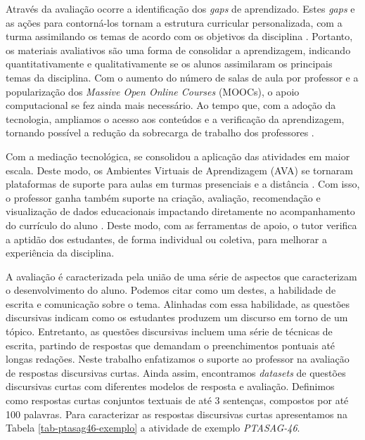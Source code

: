 Através da avaliação ocorre a identificação dos \textit{gaps} de aprendizado. Estes \textit{gaps} e as ações para contorná-los tornam a estrutura curricular personalizada, com a turma assimilando os temas de acordo com os objetivos da disciplina \cite{biggs1998}. Portanto, os materiais avaliativos são uma forma de consolidar a aprendizagem, indicando quantitativamente e qualitativamente se os alunos assimilaram os principais temas da disciplina. Com o aumento do número de salas de aula por professor e a popularização dos \textit{Massive Open Online Courses} (MOOCs), o apoio computacional se fez ainda mais necessário. Ao tempo que, com a adoção da tecnologia, ampliamos o acesso aos conteúdos e a verificação da aprendizagem, tornando possível a redução da sobrecarga de trabalho dos professores \cite{dunlap2005}.

Com a mediação tecnológica, se consolidou a aplicação das atividades em maior escala. Deste modo, os Ambientes Virtuais de Aprendizagem (AVA) \cite{maquine2020} se tornaram plataformas de suporte para aulas em turmas presenciais e a distância \cite{raes2020}. Com isso, o professor ganha também suporte na criação, avaliação, recomendação e visualização de dados educacionais impactando diretamente no acompanhamento do currículo do aluno \cite{paiva2012}. Deste modo, com as ferramentas de apoio, o tutor verifica a aptidão dos estudantes, de forma individual ou coletiva, para melhorar a experiência da disciplina.

A avaliação é caracterizada pela união de uma série de aspectos que caracterizam o desenvolvimento do aluno. Podemos citar como um destes, a habilidade de escrita e comunicação sobre o tema. Alinhadas com essa habilidade, as questões discursivas indicam como os estudantes produzem um discurso em torno de um tópico. Entretanto, as questões discursivas incluem uma série de técnicas de escrita, partindo de respostas que demandam o preenchimentos pontuais até longas redações. Neste trabalho enfatizamos o suporte ao professor na avaliação de respostas discursivas curtas. Ainda assim, encontramos \textit{datasets} de questões discursivas curtas com diferentes modelos de resposta e avaliação. Definimos como respostas curtas conjuntos textuais de até 3 sentenças, compostos por até 100 palavras. Para caracterizar as respostas discursivas curtas apresentamos na Tabela \ref{tab-ptasag46-exemplo} a atividade de exemplo \textit{PTASAG-46}.

